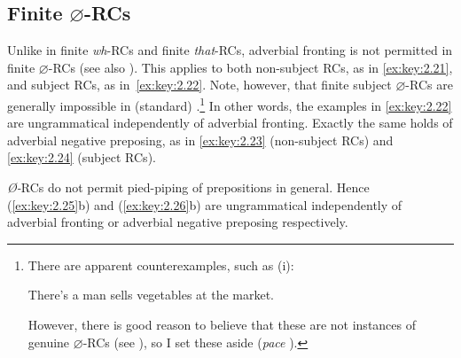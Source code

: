\documentclass[output=paper]{langsci/langscibook}
\begin{document}
\subsection{Finite $\varnothing$-RCs}

Unlike in finite \emph{wh}{-\glspl{RC} and finite} \emph{that}{-RCs, adverbial
fronting is not permitted in finite}
$\varnothing$-\glspl{RC} (see also \citealt{Doherty1993,Doherty2000}). This applies to both
non-subject RCs, as in \eqref{ex:key:2.21}, and subject RCs, as
in~\eqref{ex:key:2.22}. Note, however, that finite subject
$\varnothing${-\glspl{RC} are} generally impossible in (standard)
.\footnote{There are apparent counterexamples, such as (i):

    \begin{exe}
          There’s a man sells vegetables at the market.
    \end{exe}

However, there is good reason to believe that these are not instances of
genuine $\varnothing$-\glspl{RC} (see
\citealt{denDikken2005,Harris1980,Henry1995,Lambrecht1988,McCawley1998}),
so I set these aside (\emph{pace} \citealt{Doherty1993,Doherty2000}).} In other
words, the examples in \eqref{ex:key:2.22} are ungrammatical independently of adverbial
fronting. Exactly the same holds of adverbial negative preposing, as in \eqref{ex:key:2.23}
(non-subject RCs) and \eqref{ex:key:2.24} (subject RCs).

\ea\label{ex:key:2.21}
    \z
\z
\ea\label{ex:key:2.22}
    \z
\z
\ea\label{ex:key:2.23}
    \z
\z
\ea\label{ex:key:2.24}
    \z
\z
\emph{Ø-}RCs do not permit pied-piping of prepositions in general. Hence (\ref{ex:key:2.25}b)
and (\ref{ex:key:2.26}b) are ungrammatical independently of adverbial fronting or adverbial
negative preposing respectively.
\end{document}
